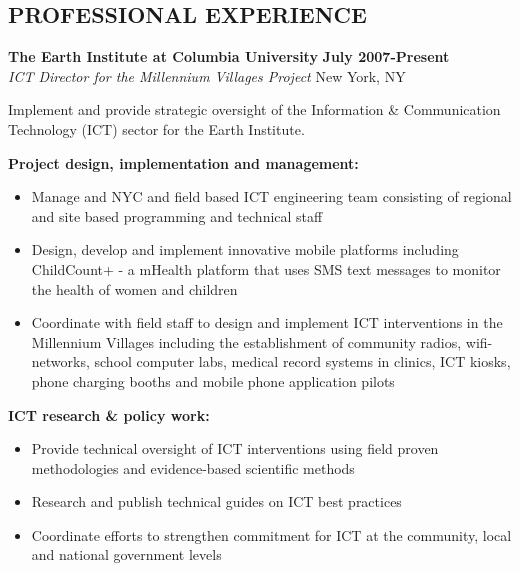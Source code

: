 \documentclass{res}
\begin{document}
\thispagestyle{empty} %

\address{ 501 W. 156th St \#65 \\   New York, NY 10032 \\ +1.646.463.1273}      
                                      
\address{mlberg@gmail.com}

\begin{resume}
 
\section{PROFESSIONAL EXPERIENCE} 
\vspace{8pt}
\textbf{The Earth Institute at Columbia University} \hfill        \textbf{July 2007-Present} \\
\emph{ICT Director for the Millennium Villages Project}       \hfill   New York, NY

Implement and provide strategic oversight of the Information \& Communication Technology (ICT) sector for the Earth Institute.

\textbf{Project design, implementation and management: }
\begin{itemize} \itemsep -2pt %
	\item Manage and NYC and field based ICT engineering team consisting of regional and site based programming and technical staff
	\item Design, develop and implement innovative mobile platforms including ChildCount+ - a mHealth platform that uses SMS text messages to monitor the health of women and children
	\item Coordinate with field staff to design and implement ICT interventions in the Millennium Villages including the establishment of community radios, wifi-networks, school computer labs, medical record systems in clinics, ICT kiosks, phone charging booths and mobile phone application pilots
 \end{itemize} \vspace{-4pt}

\textbf{ICT research \& policy work:}
\begin{itemize} \itemsep -2pt %
	\item Provide technical oversight of ICT interventions using field proven methodologies and evidence-based scientific methods
	\item Research and publish technical guides on ICT best practices
	\item Coordinate efforts to strengthen commitment for ICT at the community, local and national government levels  
 \end{itemize} \vspace{-4pt}


\end{resume}
\end{document}
